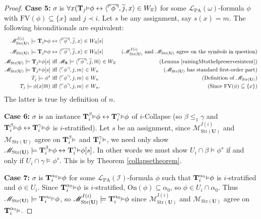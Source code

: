 \documentclass[reqno]{article}
\theoremstyle{definition}
\def\L{\mathscr{L}}
\def\M{\mathscr{M}}
\def\T{\mathbf{T}}
\def\S{\mathbf{S}}
\def\U{\mathbf{U}}
\def\FV{\mathrm{FV}}
\def\LPA{\L_{\mathrm{PA}}}
\def\indset{\mathcal I}
\def\onset{\mathrm{On}}
\renewcommand{\Pr}[1]{\T_{#1}\mbox{\small${\vDash}$}}
\newcommand{\Prr}[2]{\T^{#1}_{#2}\mbox{\small${\vDash}$}}
\newcommand{\case}[1]{\textbf{Case #1:}}
\newcommand{\str}[1]{\mathrm{Str}(#1)} \newcommand{\Str}[1]{\str{#1}}
\begin{document}
\begin{proof}
\item
\case5
$\sigma$ is
$\forall x(\Pr j\phi\leftrightarrow\langle\overline{\ulcorner\phi\urcorner},\overline j,
x\rangle\in W_{\overline n})$
for some $\LPA(\omega)$-formula $\phi$ with $\FV(\phi)\subseteq\{x\}$
and $j\prec i$.
Let $s$ be any assignment, say $s(x)=m$.
The following biconditionals are equivalent:
\begin{align*}
\M^{I(i)}_{\str{\U}} \models \Pr j\phi&\leftrightarrow
\langle\overline{\ulcorner\phi\urcorner}, \overline j,x\rangle\in W_{\overline n}[s]\\
\M_{\str{\U}} \models \Pr j\phi&\leftrightarrow
\langle\overline{\ulcorner\phi\urcorner}, \overline j,x\rangle\in W_{\overline n}[s]
  &\mbox{($\M^{I(i)}_{\str{\U}}$ and $\M_{\str{\U}}$ agree on the symbols in question)}\\
\M_{\str{\U}} \models \Pr j\phi[s]&\mbox{ iff }\M_\S\models
\langle\overline{\ulcorner\phi\urcorner}, \overline j,\overline m\rangle\in W_{\overline n}
  &\mbox{(Lemma \ref{raisingMtotheIpreservesintent})}\\
\M_{\str{\U}} \models \Pr j\phi[s]&\mbox{ iff }
\langle\ulcorner\phi\urcorner,j,m\rangle\in W_n
  &\mbox{($\M_{\str{\U}}$ has standard first-order part)}\\
T_j \models \phi^s&\mbox{ iff }
\langle\ulcorner\phi\urcorner,j,m\rangle\in W_n
  &\mbox{(Definition of $\M_{\str{\U}}$)}\\
T_j \models \phi(x|\overline m)&\mbox{ iff }
\langle\ulcorner\phi\urcorner,j,m\rangle\in W_n.
  &\mbox{(Since $\FV(\phi)\subseteq\{x\}$)}
\end{align*}
The latter is true by definition of $n$.

\item
\case6
$\sigma$ is an instance $\Prr\beta i\phi\leftrightarrow\Prr\gamma i\phi$
of $i$-Collapse (so $\beta\leq_1\gamma$ and $\Prr\beta i\phi\leftrightarrow\Prr\gamma i\phi$ is
$i$-stratified).
Let $s$ be an assignment,
since $\M^{I(i)}_{\str{\U}}$ and $\M_{\str{\U}}$ agree
on $\Prr\beta i$ and $\Prr\gamma i$, we need only show
$\M_{\str{\U}}\models\Prr\beta i\phi\leftrightarrow\Prr\gamma i\phi[s]$.
In other words we must show $U_i\cap\beta\models\phi^s$
if and only if $U_i\cap\gamma\models\phi^s$.
This is by Theorem \ref{collapsetheorem}.

\item
\case7
$\sigma$ is $\Prr{\alpha_0}i\phi$ for some $\LPA(\indset)$-formula $\phi$
such that $\Prr{\alpha_0}i\phi$ is $i$-stratified and $\phi\in U_i$.
Since $\Prr{\alpha_0}i\phi$
is $i$-stratified, $\onset(\phi)\subseteq\alpha_0$, so $\phi\in U_i\cap\alpha_0$.
Thus $\M_{\str{\U}}\models \Prr{\alpha_0}i\phi$,
so $\M^{I(i)}_{\str{\U}}\models \Prr{\alpha_0}i\phi$ since
$\M^{I(i)}_{\str{\U}}$ and $\M_{\str{\U}}$ agree on $\Prr{\alpha_0}i$.


\end{proof}
\end{document}
